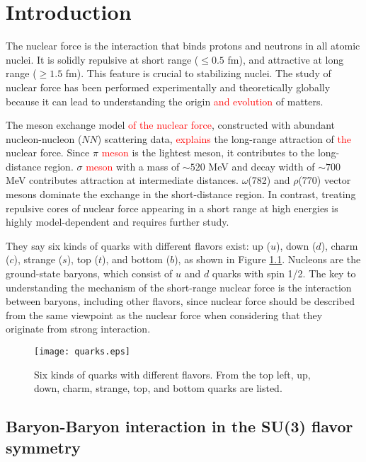 %
\graphicspath{{./pictures/chapter1/}}

\chapter{Introduction} 
\label{chap1}
The nuclear force is the interaction that binds protons and neutrons in all atomic nuclei. It is solidly repulsive at short range ($\leq0.5$ fm), and attractive at long range ($\geq1.5$ fm). This feature is crucial to stabilizing nuclei. The study of nuclear force has been performed experimentally and theoretically globally because it can lead to understanding the origin \textcolor{red}{and evolution} of matters. 

The meson exchange model \textcolor{red}{of the nuclear force}, constructed with abundant nucleon-nucleon ($NN$) scattering data, \textcolor{red}{explains} the long-range attraction of \textcolor{red}{the} nuclear force. Since $\pi$ \textcolor{red}{meson} is the lightest meson, it contributes to the long-distance region. $\sigma$ \textcolor{red}{meson} with a mass of $\sim520$ MeV and decay width of $\sim700$ MeV contributes attraction at intermediate distances. $\omega$(782) and $\rho$(770) vector mesons dominate the exchange in the short-distance region. In contrast, treating repulsive cores of nuclear force appearing in a short range at high energies is highly model-dependent and requires further study. 

They say six kinds of quarks with different flavors exist: up ($u$), down ($d$), charm ($c$), strange ($s$), top ($t$), and bottom ($b$), as shown in Figure \ref{fig-quarks}. Nucleons are the ground-state baryons, which consist of $u$ and $d$ quarks with spin 1/2. The key to understanding the mechanism of the short-range nuclear force is the interaction between baryons, including other flavors, since nuclear force should be described from the same viewpoint as the nuclear force when considering that they originate from strong interaction. 
\begin{figure}[h!]
  \begin{center}
  \texttt{[image: quarks.eps]}
  \caption{Six kinds of quarks with different flavors. From the top left, up, down, charm, strange, top, and bottom quarks are listed.}
  \label{fig-quarks}
  \end{center}
\end{figure}

\section{Baryon-Baryon interaction in the SU(3) flavor symmetry}
\label{sec-BBint}

